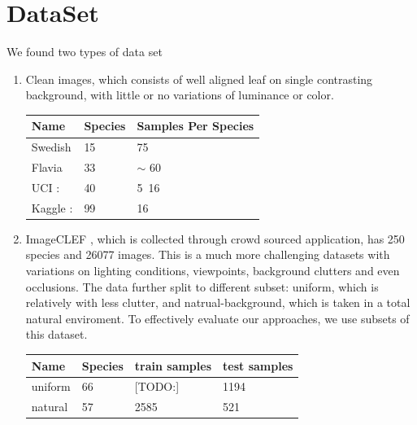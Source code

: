\documentclass[journal, 10pt]{IEEEtran}
\begin{document}
\section{DataSet}
\label{DataSet}
    We found two types of data set
\begin{enumerate}
  \item Clean images, which consists of well aligned leaf on single contrasting background, with little or no variations of luminance or color. \\
  \begin{center}
      \begin{tabular}{| l | l | l |}
      \hline
      Name & Species & Samples Per Species        \\ \hline
      Swedish \cite{SwedishLeafDataset} & 15 & 75        \\ \hline
      Flavia \cite{FlaviaDataset}       & 33 & $\sim$ 60 \\ \hline
      UCI \cite{UCIDataSet}:            & 40 & 5~16      \\ \hline
      Kaggle \cite{Pedro13}:            & 99 & 16        \\ \hline
      \end{tabular}
  \end{center}

  \item ImageCLEF \cite{ImageCLEF2013}, which is collected through crowd sourced application, has 250 species and 26077 images. This is a much more challenging datasets with variations on lighting conditions, viewpoints, background clutters and even occlusions. The data further split to different subset: uniform, which is relatively with less clutter, and natrual-background, which is taken in a total natural enviroment. To effectively evaluate our approaches, we use subsets of this dataset.\\
  \begin{center}
      \begin{tabular}{| l | l | l | l |}
      \hline
      Name    & Species & train samples & test samples \\ \hline
      uniform & 66      & [TODO:]       & 1194         \\ \hline
      natural & 57      & 2585          & 521          \\ \hline
      \end{tabular}
  \end{center}
\end{enumerate}
\end{document}

